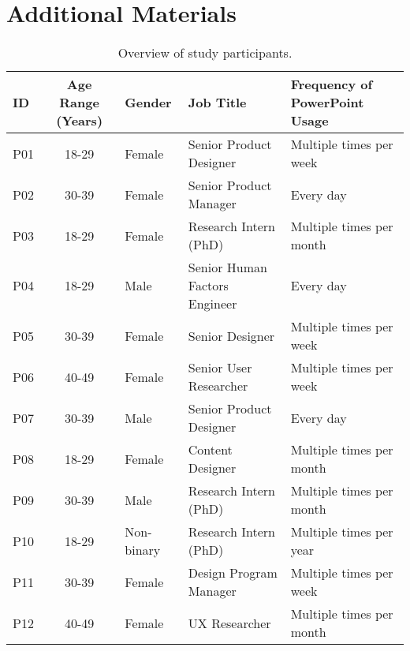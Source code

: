 \newpage
\onecolumn

\section{Additional Materials}


\begin{table*}[h]
\caption{Overview of study participants.}
\begin{tabular}{lclll}
\toprule
\textbf{ID} & \textbf{Age Range (Years)} & \textbf{Gender}     & \textbf{Job Title}  & \textbf{Frequency of PowerPoint Usage} \\
\midrule
P01            & 18-29     & Female     & Senior Product Designer       & Multiple times per week                      \\
P02            & 30-39     & Female     & Senior Product Manager        & Every day                                    \\
P03            & 18-29     & Female     & Research Intern (PhD)             & Multiple times per month                     \\
P04            & 18-29     & Male       & Senior Human Factors Engineer & Every day                                    \\
P05            & 30-39     & Female     & Senior Designer               & Multiple times per week                      \\
P06            & 40-49     & Female     & Senior User Researcher        & Multiple times per week                      \\
P07            & 30-39     & Male       & Senior Product Designer       & Every day                                    \\
P08            & 18-29     & Female     & Content Designer              & Multiple times per month                     \\
P09            & 30-39     & Male       & Research Intern (PhD)         & Multiple times per month                     \\
P10            & 18-29     & Non-binary & Research Intern (PhD)         & Multiple times per year                      \\
P11            & 30-39     & Female     & Design Program Manager        & Multiple times per week                      \\
P12            & 40-49     & Female     & UX Researcher                 & Multiple times per month      \\                                       

\end{tabular}
\end{table*}
